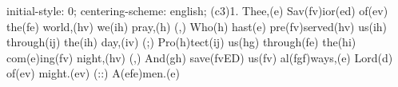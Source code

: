 initial-style: 0;
centering-scheme: english;
(c3)1. Thee,(e) Sav(fv)ior(ed) of(ev) the(fe) world,(hv) we(ih) pray,(h) (,)
Who(h) hast(e) pre(fv)served(hv) us(ih) through(ij) the(ih) day,(iv) (;)
Pro(h)tect(ij) us(hg) through(fe) the(hi) com(e)ing(fv) night,(hv) (,)
And(gh) save(fvED) us(fv) al(fgf)ways,(e) Lord(d) of(ev) might.(ev) (::)
A(efe)men.(e)